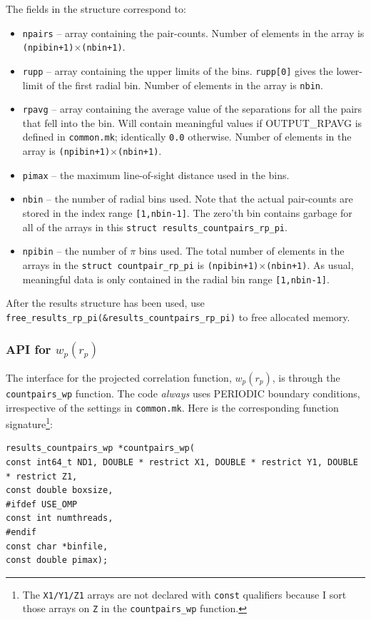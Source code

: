 \documentclass[12pt,titlepage]{article}
\newcommand{\wprp}{\ensuremath{{w_p(r_p)}}\xspace}
\begin{document}
The fields in the structure correspond to:
\begin{itemize}
\item \texttt{npairs} -- array containing the pair-counts.  Number of elements in the array is \texttt{(npibin+1)$\times$(nbin+1)}.
\item \texttt{rupp}   -- array containing the upper limits of the bins. \texttt{rupp[0]} gives the lower-limit of the first radial bin. Number of elements 
in the array is \texttt{nbin}. 
\item \texttt{rpavg}  -- array containing the average value of the separations for all the pairs that fell into the bin. Will contain 
meaningful values if OUTPUT\_RPAVG is defined in \texttt{common.mk}; identically \texttt{0.0} otherwise. Number of elements in the array is \texttt{(npibin+1)$\times$(nbin+1)}.
\item \texttt{pimax}  -- the maximum line-of-sight distance used in the bins. 
\item \texttt{nbin}   -- the number of radial bins used. Note that the actual pair-counts are stored in the index range \texttt{[1,nbin-1]}. The
zero'th bin contains garbage for all of the arrays in this \texttt{struct results\_countpairs\_rp\_pi}.
\item \texttt{npibin} -- the number of $\pi$ bins used. The total number of elements in the arrays in the \texttt{struct countpair\_rp\_pi} is 
\texttt{(npibin+1)$\times$(nbin+1)}. As usual, meaningful data is only contained in the radial bin range \texttt{[1,nbin-1]}. 
\end{itemize}
After the results structure has been used, use \texttt{free\_results\_rp\_pi(\&results\_countpairs\_rp\_pi)} to free allocated memory. 

\subsubsection{API for \texorpdfstring{\wprp}{wp(rp)}}
The interface for the projected correlation function, \wprp, is through the \texttt{countpairs\_wp} function. The code 
{\em always} uses PERIODIC boundary conditions, irrespective of the settings in \texttt{common.mk}. Here is 
the corresponding function signature\footnote{The \texttt{X1/Y1/Z1} arrays are not 
declared with \texttt{const} qualifiers because I sort those arrays on \texttt{Z} in the 
\texttt{countpairs\_wp} function.}:
\begin{lstlisting}[label={code:API_wp},caption={API for the \wprp.}]
results_countpairs_wp *countpairs_wp(
const int64_t ND1, DOUBLE * restrict X1, DOUBLE * restrict Y1, DOUBLE * restrict Z1,
const double boxsize, 
#ifdef USE_OMP
const int numthreads,
#endif
const char *binfile,
const double pimax);
\end{lstlisting}
\end{document}
